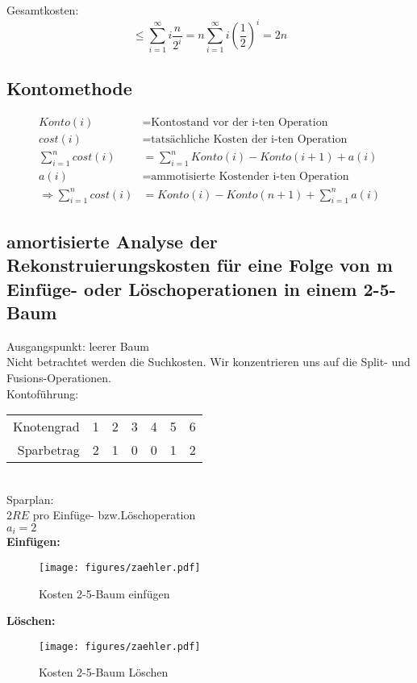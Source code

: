 \documentclass[a4paper,draft,twoside,10pt]{report}
\begin{document}
Gesamtkosten:\\
\[\le \sum_{i=1}^\infty i\frac{n}{2^i}=n\sum_{i=1}^\infty i\left(\frac{1}{2}\right)^i =2n\]


\subsection{Kontomethode}
\begin{align*}
Konto(i)&= \mbox{Kontostand vor der i-ten Operation}\\
cost(i)&=\mbox{tatsächliche Kosten der i-ten Operation}\\
\sum_{i=1}^n cost(i)&=\sum_{i=1}^n Konto(i)-Konto(i+1)+a(i)\\
a(i)&=\mbox{ammotisierte Kostender i-ten Operation}\\
\Rightarrow \sum_{i=1}^n cost(i)&=Konto(i)-Konto(n+1)+\sum_{i=1}^n a(i)
\end{align*}

\subsection{amortisierte Analyse der Rekonstruierungskosten für eine Folge von m Einfüge- oder Löschoperationen in einem 2-5-Baum}
Ausgangspunkt: leerer Baum\\
Nicht betrachtet werden die Suchkosten. Wir konzentrieren uns auf die Split- und Fusions-Operationen.\\[.5em]
Kontoführung:\\
\begin{tabular}{rcccccc}
Knotengrad&1&2&3&4&5&6\\
Sparbetrag&2&1&0&0&1&2
\end{tabular}\\[.5em]
Sparplan:\\
$2RE$ pro Einfüge- bzw.Löschoperation\\
$a_i=2$\\
\textbf{Einfügen:}
\begin{figure}[H]\center
\texttt{[image: figures/zaehler.pdf]}
\caption{Kosten 2-5-Baum einfügen}
\end{figure}
\textbf{Löschen:}
\begin{figure}[H]\center
\texttt{[image: figures/zaehler.pdf]}
\caption{Kosten 2-5-Baum Löschen}
\end{figure}
\end{document}
